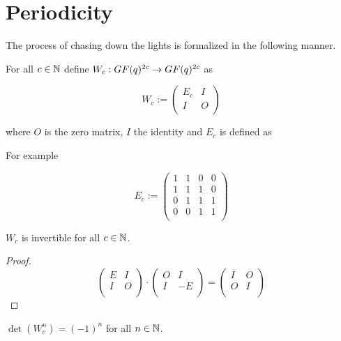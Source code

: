 \section{Periodicity}

The process of chasing down the lights is formalized in the following
manner.

For all $c\in\mathbb{N}$ define $W_{c} : GF(q)^{2c} \rightarrow GF(q)^{2c}$
as

\[
W_{c} := \left(
\begin{array}{cc}
  E_{c} & I \\
  I    & O \\
\end{array}
\right)
\]

where $O$ is the zero matrix, $I$ the identity and $E_{c}$ is defined
as

For example

\[
E_{c} := \left(
\begin{array}{cccc}
  1 & 1 & 0 & 0 \\
  1 & 1 & 1 & 0 \\
  0 & 1 & 1 & 1 \\
  0 & 0 & 1 & 1 \\
\end{array}
\right)
\]

\begin{lemma}
  $W_{c}$ is invertible for all $c\in\mathbb{N}$.
\end{lemma}

\begin{proof}
  \[
  \left(
  \begin{array}{cc}
    E & I \\
    I & O \\
  \end{array}
  \right)
  \cdot
  \left(
  \begin{array}{cc}
    O & I  \\
    I & -E \\
  \end{array}
  \right)
  =
  \left(
  \begin{array}{cc}
    I & O \\
    O & I \\
  \end{array}			
  \right)
  \]
\end{proof}


\begin{lemma}
  $\det(W_{c}^{n}) = (-1)^{n}$ for all $n\in\mathbb{N}$.
\end{lemma}

